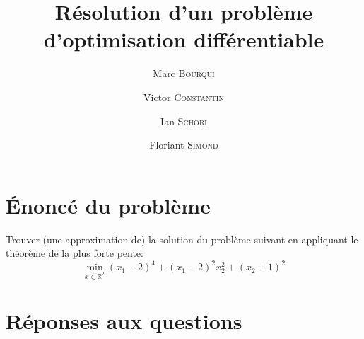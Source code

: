 \documentclass[11pt,a4paper,twoside,onecolumn,titlepage]{report}
\title{Résolution d'un problème d'optimisation différentiable}
\author{Marc \textsc{Bourqui} \and Victor \textsc{Constantin} \and Ian \textsc{Schori} \and Floriant \textsc{Simond}}
\begin{document}
\maketitle

\section*{Énoncé du problème}

Trouver (une approximation de) la solution du problème suivant en appliquant le théorème de la plus forte pente:
\begin{equation}
\min_{x\in\mathbb{R}^2} (x_1-2)^4 + (x_1-2)^2x_2^2 + (x_2+1)^2
\end{equation}

\section*{Réponses aux questions}
\end{document}
